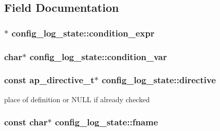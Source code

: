 \subsection{Field Documentation}
\subsubsection[{\texorpdfstring{condition\+\_\+expr}{condition_expr}}]{$\ast$ config\+\_\+log\+\_\+state\+::condition\+\_\+expr}\hypertarget{structconfig__log__state_aac39b4c687d98be1023d0789551c2ca7}{}\label{structconfig__log__state_aac39b4c687d98be1023d0789551c2ca7}
\subsubsection[{\texorpdfstring{condition\+\_\+var}{condition_var}}]{\setlength{\rightskip}{0pt plus 5cm}char$\ast$ config\+\_\+log\+\_\+state\+::condition\+\_\+var}\hypertarget{structconfig__log__state_a4270658aeeffd59169678f32e00f315f}{}\label{structconfig__log__state_a4270658aeeffd59169678f32e00f315f}
\subsubsection[{\texorpdfstring{directive}{directive}}]{\setlength{\rightskip}{0pt plus 5cm}const {\bf ap\+\_\+directive\+\_\+t}$\ast$ config\+\_\+log\+\_\+state\+::directive}\hypertarget{structconfig__log__state_a16eaf38f7319d1e9845c6373bc05131a}{}\label{structconfig__log__state_a16eaf38f7319d1e9845c6373bc05131a}
place of definition or N\+U\+LL if already checked 
\subsubsection[{\texorpdfstring{fname}{fname}}]{\setlength{\rightskip}{0pt plus 5cm}const char$\ast$ config\+\_\+log\+\_\+state\+::fname}\hypertarget{structconfig__log__state_a34a82ba48a1ebd328e107ccfdec6301f}{}\label{structconfig__log__state_a34a82ba48a1ebd328e107ccfdec6301f}
